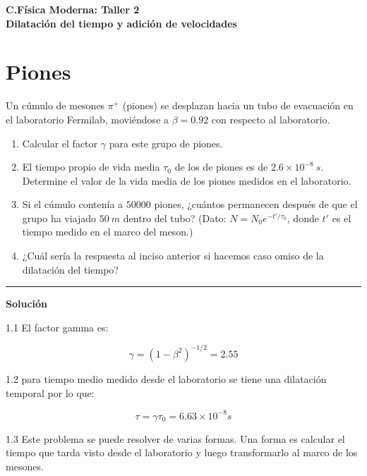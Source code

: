 \documentclass[12pt]{article}
\begin{document}
 
\begin{center}
\Large \textbf{C.Física Moderna: Taller 2}\\
\normalsize \textbf{Dilatación del tiempo y adición de velocidades}
\end{center}
 
  

\section{Piones}
 Un cúmulo de mesones $\pi^+$ (piones) se desplazan hacia un tubo de evacuación en el laboratorio Fermilab, moviéndose a $\beta= 0.92$ con respecto al laboratorio.
 	
 	\begin{enumerate}
 		\item Calcular el factor $\gamma$ para este grupo de piones.
 		\item El tiempo propio de vida media $\tau_0$ de los de piones es de $2.6\times1 0^{-8}~s$. Determine el valor de la vida media de los piones medidos en el laboratorio.
 		\item Si el cúmulo contenía a $50000$ piones,  ¿cuántos permanecen después de que el grupo ha viajado $50~m$ dentro del tubo? (Dato: $N=N_0e^{-t'/\tau_0}$, donde $t'$ es el tiempo medido en el marco del meson.)
 		\item ¿Cuál sería la respuesta al inciso anterior si hacemos caso omiso de la dilatación del tiempo?
 	\end{enumerate}
\noindent\rule{16.5cm}{0.4pt}

\begin{center}
	\textbf{Solución}	
\end{center}

1.1 El factor gamma es:

\begin{equation}
\gamma = (1-\beta^2)^{-1/2} = 2.55
\end{equation}

1.2 para tiempo medio medido desde el laboratorio se tiene una dilatación temporal por lo que:

\begin{equation}
\tau =\gamma \tau_0 = 6.63 \times 10^{-8} s
\end{equation}

1.3 Este problema se puede resolver de varias formas. Una forma es calcular el tiempo que tarda visto desde el laboratorio y luego transformarlo al marco de los mesones.
\end{document}
